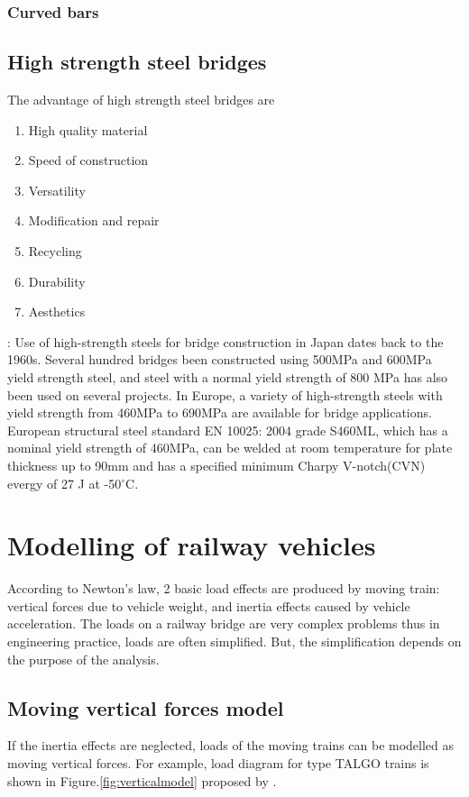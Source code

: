 \subsubsection{Curved bars}

\subsection{High strength steel bridges}
The advantage of high strength steel bridges are

\begin{enumerate}
	\item High quality material
	\item Speed of construction
	\item Versatility
	\item Modification and repair
	\item Recycling
	\item Durability
	\item Aesthetics
\end{enumerate}

\cite{macdougall2004state}: Use of high-strength steels for bridge construction in Japan dates back to the 1960s. Several hundred bridges been constructed using 500MPa and 600MPa yield strength steel, and steel with a normal yield strength of 800 MPa has also been used on several projects. In Europe, a variety of high-strength steels with yield strength from 460MPa to 690MPa are available for bridge applications. European structural steel standard EN 10025: 2004 grade S460ML, which has a nominal yield strength of 460MPa, can be welded at room temperature for plate thickness up to 90mm and has a specified minimum Charpy V-notch(CVN) evergy of 27 J at -50$^\circ$C.

\section{Modelling of railway vehicles}
According to Newton's law, 2 basic load effects are produced by moving train: vertical forces due to vehicle weight, and inertia effects caused by vehicle acceleration. The loads on a railway bridge are very complex problems thus in engineering practice, loads are often simplified. But, the simplification depends on the purpose of the analysis. 

\subsection{Moving vertical forces model}
If the inertia effects are neglected, loads of the moving trains can be modelled as moving vertical forces. For example, load diagram for type TALGO trains is shown in Figure.\ref{fig:verticalmodel} proposed by \cite{uic}.

